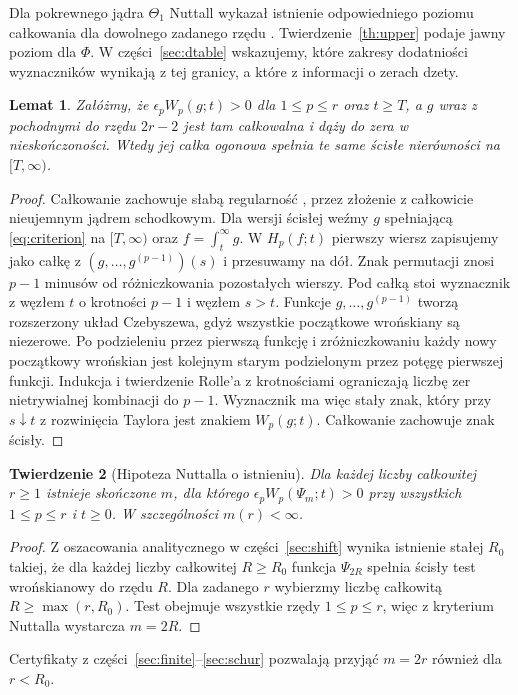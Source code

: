 \documentclass[11pt,a4paper,reqno]{amsart}
\newtheorem{theorem}{Twierdzenie}[section]
\newtheorem{lemma}[theorem]{Lemat}
\numberwithin{equation}{section}
\begin{document}
Dla pokrewnego jądra \(\Theta_1\) Nuttall wykazał istnienie odpowiedniego poziomu całkowania dla dowolnego zadanego rzędu \cite{thetaone}. Twierdzenie~\ref{th:upper} podaje jawny poziom dla \(\Phi\). W części~\ref{sec:dtable} wskazujemy, które zakresy dodatniości wyznaczników wynikają z tej granicy, a które z informacji o zerach dzety.

\begin{lemma}\label{lem:persist}
Załóżmy, że \(\epsilon_p W_p(g;t)>0\) dla \(1\le p\le r\) oraz \(t\ge T\), a \(g\) wraz z pochodnymi do rzędu \(2r-2\) jest tam całkowalna i dąży do zera w nieskończoności. Wtedy jej całka ogonowa spełnia te same ścisłe nierówności na \([T,\infty)\).
\end{lemma}


\begin{proof}
Całkowanie zachowuje słabą regularność \cite[uwaga 4.1]{nuttall}, przez złożenie z całkowicie nieujemnym jądrem schodkowym. Dla wersji ścisłej weźmy \(g\) spełniającą \eqref{eq:criterion} na \([T,\infty)\) oraz \(f=\int_t^\infty g\). W \(H_p(f;t)\) pierwszy wiersz zapisujemy jako całkę z \((g,\ldots,g^{(p-1)})(s)\) i przesuwamy na dół. Znak permutacji znosi \(p-1\) minusów od różniczkowania pozostałych wierszy. Pod całką stoi wyznacznik z węzłem \(t\) o krotności \(p-1\) i węzłem \(s>t\). Funkcje \(g,\ldots,g^{(p-1)}\) tworzą rozszerzony układ Czebyszewa, gdyż wszystkie początkowe wrońskiany są niezerowe. Po podzieleniu przez pierwszą funkcję i zróżniczkowaniu każdy nowy początkowy wrońskian jest kolejnym starym podzielonym przez potęgę pierwszej funkcji. Indukcja i twierdzenie Rolle'a z krotnościami ograniczają liczbę zer nietrywialnej kombinacji do \(p-1\). Wyznacznik ma więc stały znak, który przy \(s\downarrow t\) z rozwinięcia Taylora jest znakiem \(W_p(g;t)\). Całkowanie zachowuje znak ścisły.
\end{proof}


\begin{theorem}[Hipoteza Nuttalla o istnieniu]\label{th:existence}
Dla każdej liczby całkowitej \(r\ge1\) istnieje skończone \(m\), dla którego \(\epsilon_pW_p(\Psi_m;t)>0\) przy wszystkich \(1\le p\le r\) i \(t\ge0\). W szczególności \(m(r)<\infty\).
\end{theorem}
\begin{proof}
Z oszacowania analitycznego w części~\ref{sec:shift} wynika istnienie stałej \(R_0\) takiej, że dla każdej liczby całkowitej \(R\ge R_0\) funkcja \(\Psi_{2R}\) spełnia ścisły test wrońskianowy do rzędu \(R\). Dla zadanego \(r\) wybierzmy liczbę całkowitą \(R\ge\max(r,R_0)\). Test obejmuje wszystkie rzędy \(1\le p\le r\), więc z kryterium Nuttalla wystarcza \(m=2R\).
\end{proof}
Certyfikaty z części~\ref{sec:finite}--\ref{sec:schur} pozwalają przyjąć \(m=2r\) również dla \(r<R_0\).
\end{document}
